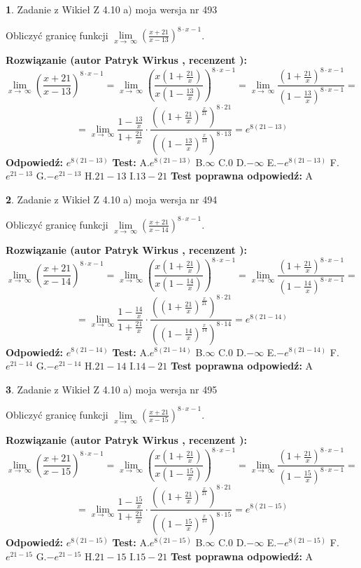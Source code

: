 \documentclass[12pt, a4paper]{article}
\theoremstyle{definition} %
\newtheorem{zad}{}
\newcommand{\zadStart}[1]{\begin{zad}#1\newline}
\newcommand{\zadStop}{\end{zad}}
\newcommand{\rozwStart}[2]{\noindent \textbf{Rozwiązanie (autor #1 , recenzent #2): }\newline}
\newcommand{\rozwStop}{\newline}
\newcommand{\odpStart}{\noindent \textbf{Odpowiedź:}\newline}
\newcommand{\odpStop}{\newline}
\newcommand{\testStart}{\noindent \textbf{Test:}\newline}
\newcommand{\testStop}{\newline}
\newcommand{\kluczStart}{\noindent \textbf{Test poprawna odpowiedź:}\newline}
\newcommand{\kluczStop}{\newline}
\begin{document}
\zadStart{Zadanie z Wikieł Z 4.10 a) moja wersja nr 493}


Obliczyć granicę funkcji  $\lim\limits_{x\to\ \infty}(\frac{x+21}{x-13})^{8\cdot x-1}$.
\zadStop
\rozwStart{Patryk Wirkus}{}
$$\lim\limits_{x\to\ \infty}(\frac{x+21}{x-13})^{8\cdot x-1} = \lim\limits_{x\to\ \infty}(\frac{x(1+\frac{21}{x})}{x(1-\frac{13}{x})})^{8\cdot x-1}=\lim\limits_{x\to\ \infty}\frac{(1+\frac{21}{x})^{8\cdot x-1}}{(1-\frac{13}{x})^{8\cdot x-1}}=$$
$$=\lim\limits_{x\to\ \infty}\frac{1-\frac{13}{x}}{1+\frac{21}{x}}\cdot\frac{((1+\frac{21}{x})^{\frac{x}{21}})^{8\cdot21}}{((1-\frac{13}{x})^{\frac{x}{13}})^{8\cdot13}}=e^{8(21-13)}$$
\rozwStop
\odpStart
$e^{8(21-13)}$
\odpStop
\testStart
A.$e^{8(21-13)}$ B.$\infty$ C.$0$ D.$-\infty$ E.$-e^{8(21-13)}$
F.$e^{21-13}$ G.$-e^{21-13}$
H.$21-13$
I.$13-21$
\testStop
\kluczStart
A
\kluczStop



\zadStart{Zadanie z Wikieł Z 4.10 a) moja wersja nr 494}


Obliczyć granicę funkcji  $\lim\limits_{x\to\ \infty}(\frac{x+21}{x-14})^{8\cdot x-1}$.
\zadStop
\rozwStart{Patryk Wirkus}{}
$$\lim\limits_{x\to\ \infty}(\frac{x+21}{x-14})^{8\cdot x-1} = \lim\limits_{x\to\ \infty}(\frac{x(1+\frac{21}{x})}{x(1-\frac{14}{x})})^{8\cdot x-1}=\lim\limits_{x\to\ \infty}\frac{(1+\frac{21}{x})^{8\cdot x-1}}{(1-\frac{14}{x})^{8\cdot x-1}}=$$
$$=\lim\limits_{x\to\ \infty}\frac{1-\frac{14}{x}}{1+\frac{21}{x}}\cdot\frac{((1+\frac{21}{x})^{\frac{x}{21}})^{8\cdot21}}{((1-\frac{14}{x})^{\frac{x}{14}})^{8\cdot14}}=e^{8(21-14)}$$
\rozwStop
\odpStart
$e^{8(21-14)}$
\odpStop
\testStart
A.$e^{8(21-14)}$ B.$\infty$ C.$0$ D.$-\infty$ E.$-e^{8(21-14)}$
F.$e^{21-14}$ G.$-e^{21-14}$
H.$21-14$
I.$14-21$
\testStop
\kluczStart
A
\kluczStop



\zadStart{Zadanie z Wikieł Z 4.10 a) moja wersja nr 495}


Obliczyć granicę funkcji  $\lim\limits_{x\to\ \infty}(\frac{x+21}{x-15})^{8\cdot x-1}$.
\zadStop
\rozwStart{Patryk Wirkus}{}
$$\lim\limits_{x\to\ \infty}(\frac{x+21}{x-15})^{8\cdot x-1} = \lim\limits_{x\to\ \infty}(\frac{x(1+\frac{21}{x})}{x(1-\frac{15}{x})})^{8\cdot x-1}=\lim\limits_{x\to\ \infty}\frac{(1+\frac{21}{x})^{8\cdot x-1}}{(1-\frac{15}{x})^{8\cdot x-1}}=$$
$$=\lim\limits_{x\to\ \infty}\frac{1-\frac{15}{x}}{1+\frac{21}{x}}\cdot\frac{((1+\frac{21}{x})^{\frac{x}{21}})^{8\cdot21}}{((1-\frac{15}{x})^{\frac{x}{15}})^{8\cdot15}}=e^{8(21-15)}$$
\rozwStop
\odpStart
$e^{8(21-15)}$
\odpStop
\testStart
A.$e^{8(21-15)}$ B.$\infty$ C.$0$ D.$-\infty$ E.$-e^{8(21-15)}$
F.$e^{21-15}$ G.$-e^{21-15}$
H.$21-15$
I.$15-21$
\testStop
\kluczStart
A
\kluczStop
\end{document}
